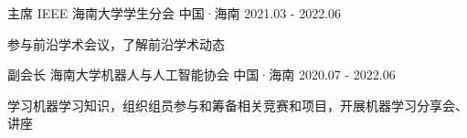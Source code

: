 

\begin{cventries}
    \cventry
    {主席} %
    {IEEE 海南大学学生分会} %
    {中国·海南} %
    {2021.03 - 2022.06} %
    {
        \begin{cvitems} %
            \item{参与前沿学术会议，了解前沿学术动态}
        \end{cvitems}
    }


    \cventry
    {副会长} %
    {海南大学机器人与人工智能协会} %
    {中国·海南} %
    {2020.07 - 2022.06} %
    {
        \begin{cvitems} %
            \item{学习机器学习知识，组织组员参与和筹备相关竞赛和项目，开展机器学习分享会、讲座}
        \end{cvitems}
    }


\end{cventries}

